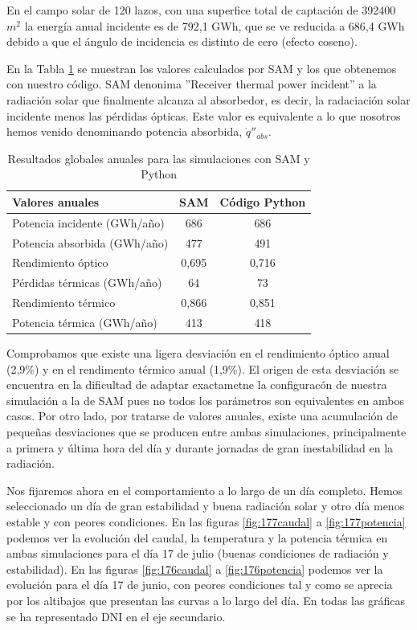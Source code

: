 En el campo solar de 120 lazos, con una superfice total de captación de 392400 $m^2$ la energía anual incidente es de 792,1 GWh, que se ve reducida a 686,4 GWh debido a que el ángulo de incidencia es distinto de cero (efecto coseno).

En la Tabla \ref{tab:generacion_anual} se muestran los valores  calculados por SAM y los que obtenemos con nuestro código. SAM denonima ''Receiver thermal power incident'' a la radiación solar que finalmente alcanza al absorbedor, es decir, la radaciación solar incidente menos las pérdidas ópticas. Este valor es equivalente a lo que nosotros hemos venido denominando potencia absorbida, $\dot q''_{abs}$. 

\begin{table}[H]
\centering
\caption{Resultados globales anuales para las simulaciones con SAM y Python}
\label{tab:generacion_anual}
\begin{tabular}{lcc}
Valores anuales  & SAM & Código Python \\ \hline
Potencia incidente (GWh/año)	& 686		& 686			\\ 
Potencia absorbida (GWh/año)	& 477		& 491			\\ 
Rendimiento óptico 			& 0,695	 	& 0,716			\\ 
Pérdidas térmicas (GWh/año)	& 64		& 73			\\ 
Rendimiento térmico			& 0,866		& 0,851			\\ 
Potencia térmica (GWh/año) 	& 413		& 418	        	\\ 
\end{tabular}
\end{table}

Comprobamos que existe una ligera desviación en el rendimiento óptico anual (2,9\%) y en el rendimento térmico anual (1,9\%). El origen de esta desviación se encuentra en la dificultad de adaptar exactametne la configuracón de nuestra simulación a la de SAM pues no todos los parámetros son equivalentes en ambos casos. Por otro lado, por tratarse de valores anuales, existe una acumulación de pequeñas desviaciones que se producen entre ambas simulaciones, principalmente a primera y última hora del día  y durante jornadas de gran inestabilidad en la radiación. 

Nos fijaremos ahora en el comportamiento a lo largo de un día completo. Hemos seleccionado un día de gran estabilidad y buena radiación solar y otro día menos estable y con peores condiciones. En las figuras \ref{fig:177caudal}  a \ref{fig:177potencia} podemos ver la evolución del caudal, la temperatura y la potencia térmica en ambas simulaciones para el día 17 de julio (buenas condiciones de radiación y estabilidad). En las figuras \ref{fig:176caudal}  a \ref{fig:176potencia} podemos ver la evolución para el día 17 de junio, con peores condiciones tal y como se aprecia por los altibajos que presentan las curvas a lo largo del día. En todas las gráficas se ha representado DNI en el eje secundario.

